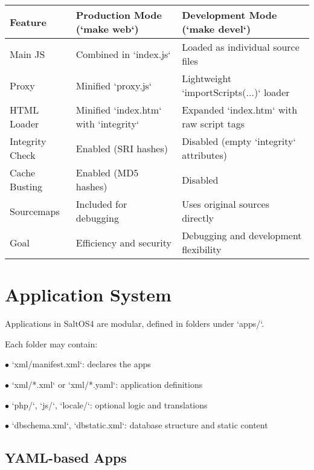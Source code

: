\documentclass[a4paper]{article}
\begin{document}
\begin{center}\begin{tabular}{|l|l|l|}
\hline \textbf{Feature} & \textbf{Production Mode (`make web`)} & \textbf{Development Mode (`make devel`)} \\
\hline Main JS & Combined in `index.js` & Loaded as individual source files \\
\hline Proxy & Minified `proxy.js` & Lightweight `importScripts(...)` loader \\
\hline HTML Loader & Minified `index.htm` with `integrity` & Expanded `index.htm` with raw script tags \\
\hline Integrity Check & Enabled (SRI hashes) & Disabled (empty `integrity` attributes) \\
\hline Cache Busting & Enabled (MD5 hashes) & Disabled \\
\hline Sourcemaps & Included for debugging & Uses original sources directly \\
\hline Goal & Efficiency and security & Debugging and development flexibility \\
\hline \end{tabular}\end{center}


\hypertarget{toc31}{}
\section{Application System}

Applications in SaltOS4 are modular, defined in folders under `apps/`.

Each folder may contain:

\begin{compactitem}
\item[\color{myblue}$\bullet$] `xml/manifest.xml`: declares the apps
\item[\color{myblue}$\bullet$] `xml/*.xml` or `xml/*.yaml`: application definitions
\item[\color{myblue}$\bullet$] `php/`, `js/`, `locale/`: optional logic and translations
\item[\color{myblue}$\bullet$] `dbschema.xml`, `dbstatic.xml`: database structure and static content
\end{compactitem}

\hypertarget{toc32}{}
\subsection{YAML-based Apps}
\end{document}
